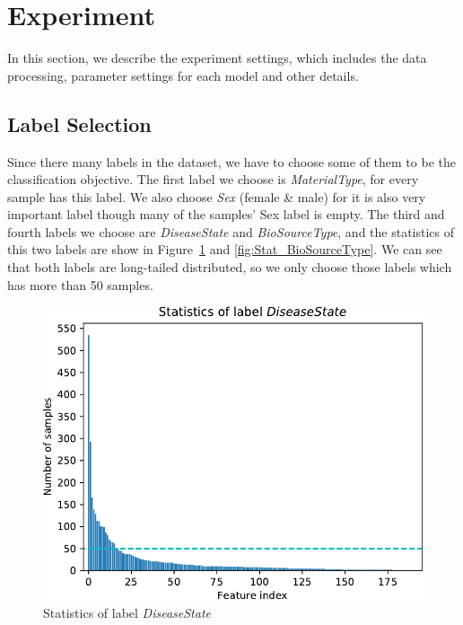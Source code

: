 \documentclass[sigconf]{acmart}
\begin{document}
	
	\section{Experiment}
	In this section, we describe the experiment settings, which includes the data processing, parameter settings for each model and other details.
	
	\subsection{Label Selection}
	Since there many labels in the dataset, we have to choose some of them to be the classification objective. The first label we choose is \textit{MaterialType}, for every sample has this label. We also choose \textit{Sex} (female \& male) for it is also very important label though many of the samples' Sex label is empty. The third and fourth labels we choose are \textit{DiseaseState} and \textit{BioSourceType}, and the statistics of this two labels are show in Figure~\ref{fig:Stat_DiseaseState} and \ref{fig:Stat_BioSourceType}. We can see that both labels are long-tailed distributed, so we only choose those labels which has more than 50 samples. 
	
	\begin{figure}[h]
	\centering
	\includegraphics[width=0.8\linewidth]{../figs/Stat_DiseaseState}
	\caption{Statistics of label \textit{DiseaseState}}
	\label{fig:Stat_DiseaseState}
	\end{figure}
	
\end{document}
